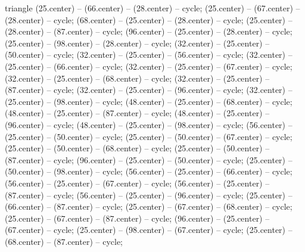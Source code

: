 \begin{pgfonlayer}{triangle}
 (25.center) -- (66.center) -- (28.center) -- cycle; 
 (25.center) -- (67.center) -- (28.center) -- cycle; 
 (68.center) -- (25.center) -- (28.center) -- cycle; 
 (25.center) -- (28.center) -- (87.center) -- cycle; 
 (96.center) -- (25.center) -- (28.center) -- cycle; 
 (25.center) -- (98.center) -- (28.center) -- cycle; 
 (32.center) -- (25.center) -- (50.center) -- cycle; 
 (32.center) -- (25.center) -- (56.center) -- cycle; 
 (32.center) -- (25.center) -- (66.center) -- cycle; 
 (32.center) -- (25.center) -- (67.center) -- cycle; 
 (32.center) -- (25.center) -- (68.center) -- cycle; 
 (32.center) -- (25.center) -- (87.center) -- cycle; 
 (32.center) -- (25.center) -- (96.center) -- cycle; 
 (32.center) -- (25.center) -- (98.center) -- cycle; 
 (48.center) -- (25.center) -- (68.center) -- cycle; 
 (48.center) -- (25.center) -- (87.center) -- cycle; 
 (48.center) -- (25.center) -- (96.center) -- cycle; 
 (48.center) -- (25.center) -- (98.center) -- cycle; 
 (56.center) -- (25.center) -- (50.center) -- cycle; 
 (25.center) -- (50.center) -- (67.center) -- cycle; 
 (25.center) -- (50.center) -- (68.center) -- cycle; 
 (25.center) -- (50.center) -- (87.center) -- cycle; 
 (96.center) -- (25.center) -- (50.center) -- cycle; 
 (25.center) -- (50.center) -- (98.center) -- cycle; 
 (56.center) -- (25.center) -- (66.center) -- cycle; 
 (56.center) -- (25.center) -- (67.center) -- cycle; 
 (56.center) -- (25.center) -- (87.center) -- cycle; 
 (56.center) -- (25.center) -- (96.center) -- cycle; 
 (25.center) -- (66.center) -- (87.center) -- cycle; 
 (25.center) -- (67.center) -- (68.center) -- cycle; 
 (25.center) -- (67.center) -- (87.center) -- cycle; 
 (96.center) -- (25.center) -- (67.center) -- cycle; 
 (25.center) -- (98.center) -- (67.center) -- cycle; 
 (25.center) -- (68.center) -- (87.center) -- cycle; 

\end{pgfonlayer}
